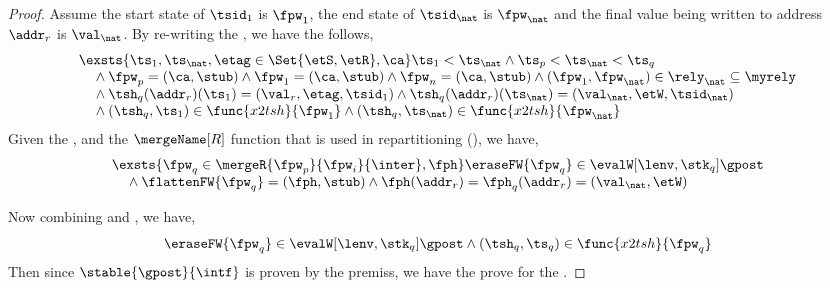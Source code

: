 \begin{proof}
Assume the start state of \( \tsid_{1} \) is \( \fpw_{1} \), the end state of \( \tsid_{\nat} \) is \( \fpw_{\nat} \) and the final value being written to address \( \addr_{r} \) is \( \val_{\nat} \).
By re-writing the , we have the follows,
\begin{equation}
    \label{equ:first-and-last-concurrent-trans}
    \begin{array}{@{}l@{}}
        \exsts{ \ts_{1}, \ts_{\nat}, \etag \in \Set{\etS, \etR}, \ca }
        \ts_{1} < \ts_{\nat}
        \land \ts_{p} < \ts_{\nat} < \ts_{q}  \\
        \quad {} \land \fpw_{p} = (\ca, \stub) 
        \land \fpw_{1} = (\ca, \stub)  
        \land \fpw_{n} = (\ca, \stub) 
        \land (\fpw_{1}, \fpw_{\nat}) \in \rely_{\nat} \subseteq \myrely \\
        \quad {} \land \tsh_{q}(\addr_{r})(\ts_{1}) = (\val_{r}, \etag, \tsid_{1}) 
        \land \tsh_{q}(\addr_{r})(\ts_{\nat}) = (\val_{\nat}, \etW, \tsid_{\nat})  \\
        \quad {} \land (\tsh_{q}, \ts_{1}) \in \func{x2tsh}{\fpw_{1}}
        \land (\tsh_{q}, \ts_{\nat}) \in \func{x2tsh}{\fpw_{\nat}}
    \end{array}
\end{equation}
Given the  , and the \( \mergeName[R] \) function that is used in repartitioning (), we have,
\begin{equation}
\label{equ:read-can-be-merged}
    \begin{array}{@{}l@{}}
      \exsts{ \fpw_{q} \in \mergeR{\fpw_{p}}{\fpw_{i}}{\inter}, \fph }  
      \eraseFW{\fpw_{q}} \in \evalW[\lenv, \stk_{q}]{\gpost} \\
      \quad {} \land \flattenFW{\fpw_{q}} = (\fph, \stub) \land \fph(\addr_{r}) = \fph_{q}(\addr_{r}) = (\val_{\nat}, \etW)
    \end{array}
\end{equation}

Now combining  and , we have, 
\begin{equation}
    \eraseFW{\fpw_{q}} \in \evalW[\lenv, \stk_{q}]{\gpost}
    \land (\tsh_{q}, \ts_{q}) \in \func{x2tsh}{\fpw_{q}}  \\
\end{equation}
Then since \( \stable{\gpost}{\intf} \) is proven by the premiss, we have the prove for the .


\end{proof}










